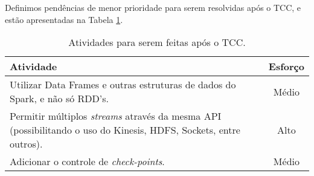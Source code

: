 Definimos pendências de menor prioridade para serem resolvidas após o TCC, e
estão apresentadas na Tabela \ref{tab:apos}.

\begin{table}[h]
  \begin{center}
  \caption{Atividades para serem feitas após o TCC.}
  \label{tab:apos}
    \begin{tabular}{|p{12cm}|c|}
        \hline \textbf{Atividade}  & \textbf{Esforço} \\

        \hline Utilizar Data Frames e outras estruturas de dados do
        Spark, e não só RDD's. & Médio \\

        \hline Permitir múltiplos \textit{streams} através da mesma
        API (possibilitando o uso do Kinesis, HDFS, Sockets, entre outros).
          & Alto \\

        \hline Adicionar o controle de \textit{check-points}. 
            & Médio \\

      \hline
    \end{tabular}
  \end{center}
\end{table}
